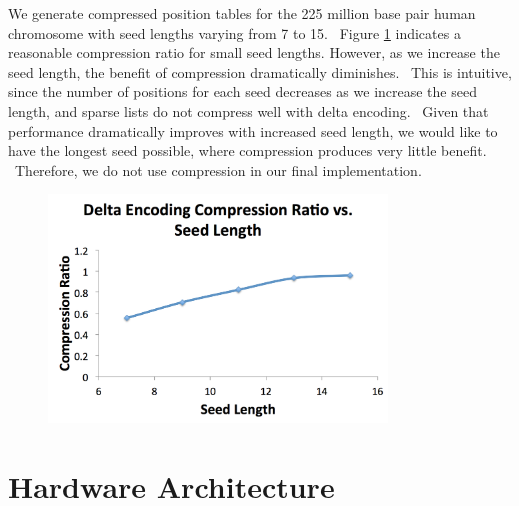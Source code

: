 \documentclass[11pt]{article}
\begin{document}
We generate compressed position tables for the 225 million base pair human chromosome with seed lengths varying from 7 to 15.  Figure \ref{compratio} indicates a reasonable compression ratio for small seed lengths. However, as we increase the seed length, the benefit of compression dramatically diminishes.  This is intuitive, since the number of positions for each seed decreases as we increase the seed length, and sparse lists do not compress well with delta encoding.  Given that performance dramatically improves with increased seed length, we would like to have the longest seed possible, where compression produces very little benefit.  Therefore, we do not use compression in our final implementation.
\begin{figure}[ht!]
\centering
\includegraphics[width=90mm]{compratio.png}
\caption{}
\label{compratio}
\end{figure}


\section{Hardware Architecture}
\end{document}
